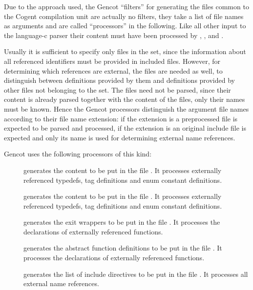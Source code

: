 Due to the approach used, the Gencot ``filters'' for generating the files common to the Cogent compilation unit are
actually no filters, they take a list of file names as arguments and are called ``processors'' in the following.
Like all other input to the language-c parser their
content must have been processed by , , and .

Usually it is sufficient to specify only  files in the set, since the information about all referenced 
identifiers must be provided in included  files. However, for determining which references are external, the
 files are needed as well, to distinguish between definitions provided by them and definitions provided
by other  files not belonging to the set. The  files need not be parsed, since their content is
already parsed together with the content of the  files, only their names must be known. Hence the Gencot
processors distinguish the argument file names according to their file name extension: if the extension is 
 a preprocessed  file is expected to be parsed and processed, if the extension is 
an original include file is expected and only its name is used for determining external name references.

Gencot uses the following processors of this kind:
\begin{description}
\item[] generates the content to be put in the file . It 
processes externally referenced typedefs, tag definitions and enum constant definitions.
\item[] generates the content to be put in the file . It 
processes externally referenced typedefs, tag definitions and enum constant definitions.
\item[] generates the exit wrappers to be put in the file . It processes
the declarations of externally referenced functions.
\item[] generates the abstract function definitions to be put in the file 
. It processes the declarations of externally referenced functions.
\item[] generates the list of include directives to be put in the file
. It processes all external name references. 
\end{description}

